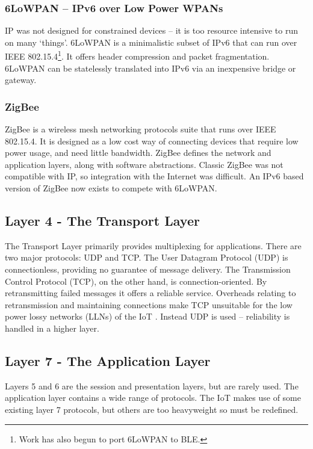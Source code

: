 \documentclass[10pt,journal,compsoc]{IEEEtran}
\begin{document}
\subsubsection{6LoWPAN -- IPv6 over Low Power WPANs}
IP was not designed for constrained devices -- it is too resource intensive to
run on many `things'. 6LoWPAN is a minimalistic subset of IPv6 that can run
over IEEE 802.15.4\footnote{Work has also begun to port 6LoWPAN to BLE.}. It
offers header compression and packet fragmentation.  6LoWPAN can be statelessly
translated into IPv6 via an inexpensive bridge or gateway. 

\subsubsection{ZigBee}
ZigBee is a wireless mesh networking protocols suite that runs over IEEE
802.15.4. It is designed as a low cost way of connecting devices that require
low power usage, and need little bandwidth. ZigBee defines the network and
application layers, along with software abstractions. Classic ZigBee was not
compatible with IP, so integration with the Internet was difficult. An IPv6
based version of ZigBee now exists to compete with 6LoWPAN.

\subsection{Layer 4 - The Transport Layer}
The Transport Layer primarily provides multiplexing for applications. There are
two major protocols:  UDP and TCP. The User Datagram Protocol (UDP) is
connectionless, providing no guarantee of message delivery. The Transmission
Control Protocol (TCP), on the other hand, is connection-oriented. By
retransmitting failed messages it offers a reliable service. Overheads relating
to retransmission and maintaining connections make TCP unsuitable for the low
power lossy networks (LLNs) of the IoT \cite{embedded}. Instead UDP is used --
reliability is handled in a higher layer.

\subsection{Layer 7 - The Application Layer}
Layers 5 and 6 are the session and presentation layers, but are rarely used.
The application layer contains a wide range of protocols. The IoT  makes use of
some existing layer 7 protocols, but others are too heavyweight so must be
redefined. 
\end{document}
